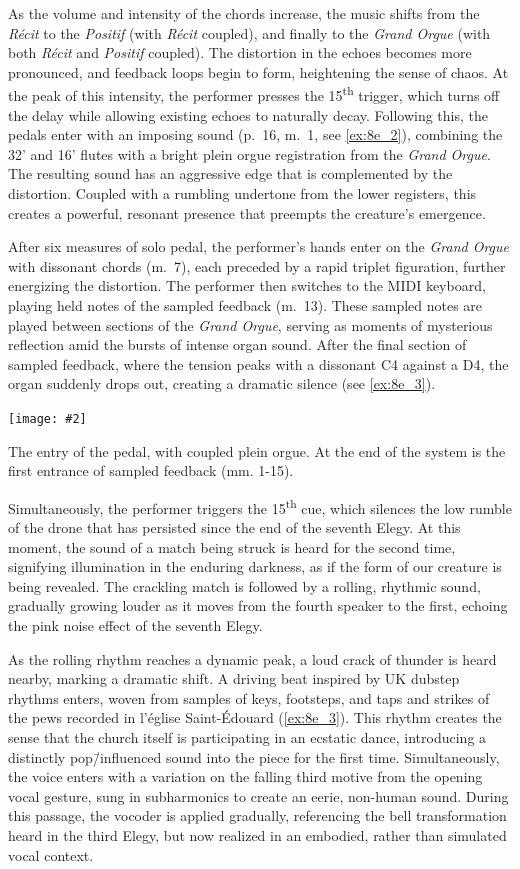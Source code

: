 \documentclass[12pt,twoside,maitrise]{dms_ks}
\newcommand{\customincludeexamples}[4][]{%
    \begin{example}[H]
        \centering
        \texttt{[image: \#2]}
        \caption{#4}
	\label{#3} 
    \end{example}
}
\theoremstyle{definition}
\begin{document}
{As the volume and intensity of the chords increase, the music shifts from the \textit{Récit} to the \textit{Positif} (with \textit{Récit} coupled), and finally to the \textit{Grand Orgue} (with both \textit{Récit} and \textit{Positif} coupled). 
The distortion in the echoes becomes more pronounced, and feedback loops begin to form, heightening the sense of chaos. 
At the peak of this intensity, the performer presses the 15\textsuperscript{th} trigger, which turns off the delay while allowing existing echoes to naturally decay. 
Following this, the pedals enter with an imposing sound (p.~16, m.~1, see \cref{ex:8e_2}), combining the 32' and 16' flutes with a bright plein orgue registration from the \textit{Grand Orgue}. 
The resulting sound has an aggressive edge that is complemented by the distortion. 
Coupled with a rumbling undertone from the lower registers, this creates a powerful, resonant presence that preempts the creature’s emergence.

After six measures of solo pedal, the performer’s hands enter on the \textit{Grand Orgue} with dissonant chords (m.~7), each preceded by a rapid triplet figuration, further energizing the distortion. 
The performer then switches to the MIDI keyboard, playing held notes of the sampled feedback (m.~13). 
These sampled notes are played between sections of the \textit{Grand Orgue}, serving as moments of mysterious reflection amid the bursts of intense organ sound.
After the final section of sampled feedback, where the tension peaks with a dissonant C4 against a D4, the organ suddenly drops out, creating a dramatic silence (see \cref{ex:8e_3}). 

\customincludeexamples[width=\textwidth]{8e_2}{ex:8e_2}{The entry of the pedal, with coupled plein orgue. At the end of the system is the first entrance of sampled feedback (mm. 1-15).}

Simultaneously, the performer triggers the 15\textsuperscript{th} cue, which silences the low rumble of the drone that has persisted since the end of the seventh Elegy. 
At this moment, the sound of a match being struck is heard for the second time, signifying illumination in the enduring darkness, as if the form of our creature is being revealed. 
The crackling match is followed by a rolling, rhythmic sound, gradually growing louder as it moves from the fourth speaker to the first, echoing the pink noise effect of the seventh Elegy.

As the rolling rhythm reaches a dynamic peak, a loud crack of thunder is heard nearby, marking a dramatic shift. 
A driving beat inspired by UK dubstep rhythms enters, woven from samples of keys, footsteps, and taps and strikes of the pews recorded in l'église Saint-Édouard (\cref{ex:8e_3}). 
This rhythm creates the sense that the church itself is participating in an ecstatic dance, introducing a distinctly pop\=/influenced sound into the piece for the first time. 
Simultaneously, the voice enters with a variation on the falling third motive from the opening vocal gesture, sung in subharmonics to create an eerie, non-human sound. 
During this passage, the vocoder is applied gradually, referencing the bell transformation heard in the third Elegy, but now realized in an embodied, rather than simulated vocal context.

}
\end{document}
